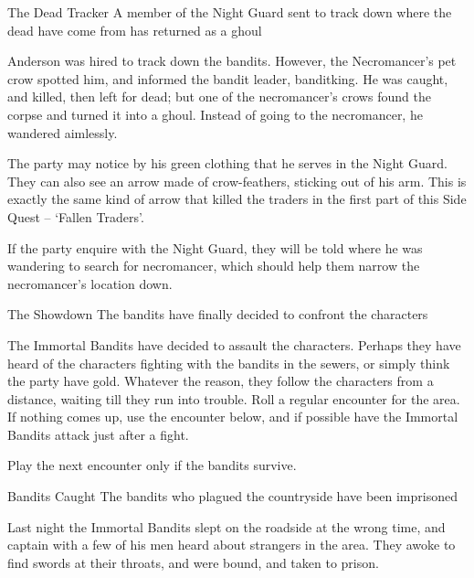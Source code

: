 \begin{multicols}{2}
{The Dead Tracker}%
{A member of the Night Guard sent to track down where the dead have come from has returned as a ghoul}%

Anderson was hired to track down the bandits.
However, the Necromancer's pet crow spotted him, and informed the bandit leader, \gls{banditking}.
He was caught, and killed, then left for dead; but one of the necromancer's crows found the corpse and turned it into a ghoul.
Instead of going to the necromancer, he wandered aimlessly.

The party may notice by his green clothing that he serves in the Night Guard.
They can also see an arrow made of crow-feathers, sticking out of his arm.
This is exactly the same kind of arrow that killed the traders in the first part of this Side Quest -- `Fallen Traders'.


If the party enquire with the Night Guard, they will be told where he was wandering to search for \gls{necromancer}, which should help them narrow the necromancer's location down.

{The Showdown}%
{The bandits have finally decided to confront the characters}%

The Immortal Bandits have decided to assault the characters.
Perhaps they have heard of the characters fighting with the bandits in the sewers, or simply think the party have gold.
Whatever the reason, they follow the characters from a distance, waiting till they run into trouble.
Roll a regular encounter for the area.
If nothing comes up, use the encounter below, and if possible have the Immortal Bandits attack just after a fight.


\banditking

Play the next encounter only if the bandits survive.

\resumecontents[Town]

{Bandits Caught}%
{The bandits who plagued the countryside have been imprisoned}%

\stopcontents[Town]

Last night the Immortal Bandits slept on the roadside at the wrong time, and \gls{captain} with a few of his men heard about strangers in the area.
They awoke to find swords at their throats, and were bound, and taken to prison.

\begin{boxtext}


\end{boxtext}
\end{multicols}
